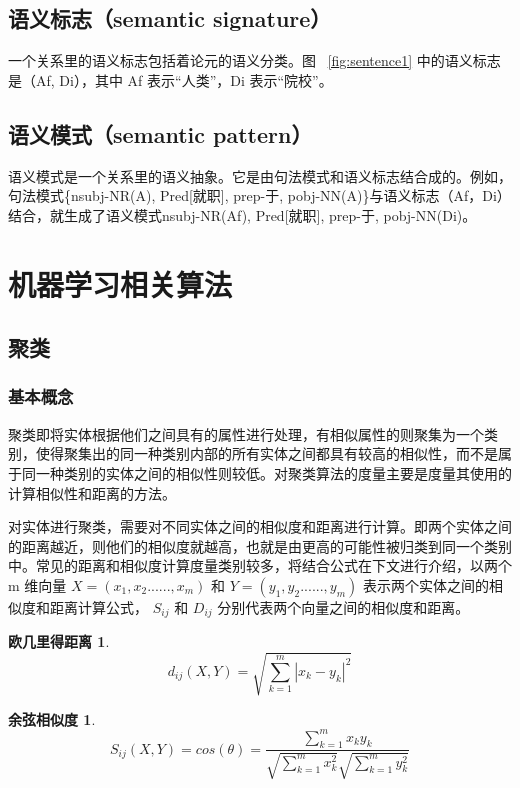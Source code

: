 \subsection{语义标志（semantic signature）}
一个关系里的语义标志包括着论元的语义分类。图 ~\ref{fig:sentence1} 中的语义标志是（Af, Di），其中 Af 表示“人类”，Di 表示“院校”。

\subsection{语义模式（semantic pattern）}
语义模式是一个关系里的语义抽象。它是由句法模式和语义标志结合成的。例如，句法模式\{nsubj-NR(A), Pred[就职], prep-于, pobj-NN(A)\}与语义标志（Af，Di）结合，就生成了语义模式{nsubj-NR(Af), Pred[就职], prep-于, pobj-NN(Di)}。

\section{机器学习相关算法}
\subsection{聚类}
\subsubsection{基本概念}
聚类即将实体根据他们之间具有的属性进行处理，有相似属性的则聚集为一个类别，使得聚集出的同一种类别内部的所有实体之间都具有较高的相似性，而不是属于同一种类别的实体之间的相似性则较低。对聚类算法的度量主要是度量其使用的计算相似性和距离的方法。

对实体进行聚类，需要对不同实体之间的相似度和距离进行计算。即两个实体之间的距离越近，则他们的相似度就越高，也就是由更高的可能性被归类到同一个类别中。常见的距离和相似度计算度量类别较多，将结合公式在下文进行介绍，以两个 m 维向量 $X = (x_1, x_2 ......, x_m)$ 和 $Y = (y_1, y_2 ......, y_m)$ 表示两个实体之间的相似度和距离计算公式， $S_{ij}$ 和 $D_{ij}$ 分别代表两个向量之间的相似度和距离。
\newtheorem*{oujilide}{欧几里得距离}
\begin{oujilide}
    \begin{equation}
        d_{ij}(X,Y) = \sqrt{\sum_{k=1}^m|{x_k - y_k}|^2}
    \end{equation}
\end{oujilide}

\newtheorem*{yuxian}{余弦相似度}
\begin{yuxian}
    \begin{equation}
        S_{ij}(X, Y) = cos(\theta) = \frac{\sum_{k=1}^mx_ky_k}{\sqrt{\sum_{k=1}^mx_k^2}\sqrt{\sum_{k=1}^my_k^2}}
    \end{equation}
\end{yuxian}

